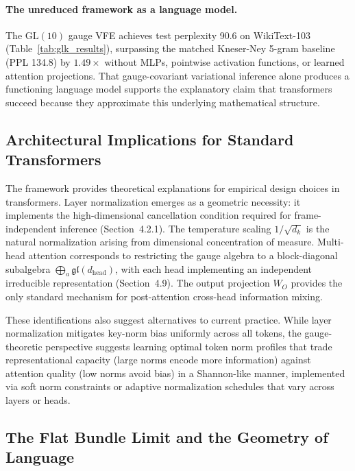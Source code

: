 \documentclass[twoside,11pt]{article}
\begin{document}
\paragraph{The unreduced framework as a language model.} The $\mathrm{GL}(10)$ gauge VFE achieves test perplexity 90.6 on WikiText-103 (Table~\ref{tab:glk_results}), surpassing the matched Kneser-Ney 5-gram baseline (PPL 134.8) by $1.49\times$ without MLPs, pointwise activation functions, or learned attention projections. That gauge-covariant variational inference alone produces a functioning language model supports the explanatory claim that transformers succeed because they approximate this underlying mathematical structure.



\subsection{Architectural Implications for Standard Transformers}

The framework provides theoretical explanations for empirical design choices in transformers. Layer normalization emerges as a geometric necessity: it implements the high-dimensional cancellation condition required for frame-independent inference (Section~4.2.1). The temperature scaling $1/\sqrt{d_k}$ is the natural normalization arising from dimensional concentration of measure. Multi-head attention corresponds to restricting the gauge algebra to a block-diagonal subalgebra $\bigoplus_a \mathfrak{gl}(d_{\mathrm{head}})$, with each head implementing an independent irreducible representation (Section~4.9). The output projection $W_O$ provides the only standard mechanism for post-attention cross-head information mixing.

These identifications also suggest alternatives to current practice. While layer normalization mitigates key-norm bias uniformly across all tokens, the gauge-theoretic perspective suggests learning optimal token norm profiles that trade representational capacity (large norms encode more information) against attention quality (low norms avoid bias) in a Shannon-like manner, implemented via soft norm constraints or adaptive normalization schedules that vary across layers or heads.

\subsection{The Flat Bundle Limit and the Geometry of Language}
\label{sec:flat_bundle}
\end{document}
